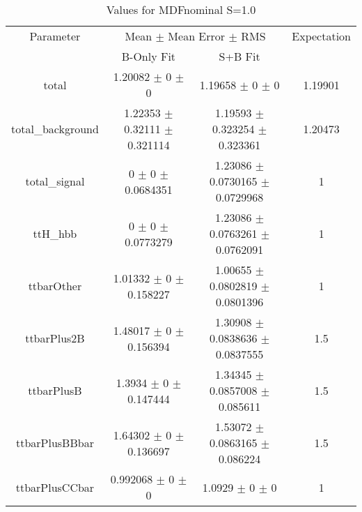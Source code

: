 \begin{table}
\centering
\caption{Values for MDFnominal S=1.0}
\begin{tabular}{cccc}
\toprule
Parameter & \multicolumn{2}{c}{Mean $\pm$ Mean Error $\pm$ RMS} & Expectation\\
 & B-Only Fit & S+B Fit & \\
\midrule
total & \num{1.20082} $\pm$ \num{0} $\pm$ \num{0} & \num{1.19658} $\pm$ \num{0} $\pm$ \num{0} & \num{1.19901}\\
total\_background & \num{1.22353} $\pm$ \num{0.32111} $\pm$ \num{0.321114} & \num{1.19593} $\pm$ \num{0.323254} $\pm$ \num{0.323361} & \num{1.20473}\\
total\_signal & \num{0} $\pm$ \num{0} $\pm$ \num{0.0684351} & \num{1.23086} $\pm$ \num{0.0730165} $\pm$ \num{0.0729968} & \num{1}\\
ttH\_hbb & \num{0} $\pm$ \num{0} $\pm$ \num{0.0773279} & \num{1.23086} $\pm$ \num{0.0763261} $\pm$ \num{0.0762091} & \num{1}\\
ttbarOther & \num{1.01332} $\pm$ \num{0} $\pm$ \num{0.158227} & \num{1.00655} $\pm$ \num{0.0802819} $\pm$ \num{0.0801396} & \num{1}\\
ttbarPlus2B & \num{1.48017} $\pm$ \num{0} $\pm$ \num{0.156394} & \num{1.30908} $\pm$ \num{0.0838636} $\pm$ \num{0.0837555} & \num{1.5}\\
ttbarPlusB & \num{1.3934} $\pm$ \num{0} $\pm$ \num{0.147444} & \num{1.34345} $\pm$ \num{0.0857008} $\pm$ \num{0.085611} & \num{1.5}\\
ttbarPlusBBbar & \num{1.64302} $\pm$ \num{0} $\pm$ \num{0.136697} & \num{1.53072} $\pm$ \num{0.0863165} $\pm$ \num{0.086224} & \num{1.5}\\
ttbarPlusCCbar & \num{0.992068} $\pm$ \num{0} $\pm$ \num{0} & \num{1.0929} $\pm$ \num{0} $\pm$ \num{0} & \num{1}\\
\bottomrule
\end{tabular}
\end{table}